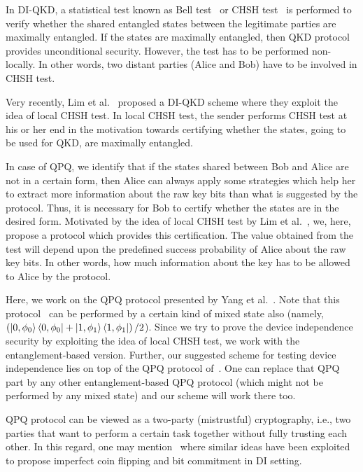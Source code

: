 \documentclass[twocolumn,pra,aps,amssymb]{revtex4}
\begin{document}
In DI-QKD, a statistical test known as Bell test~\cite{Bell} or CHSH test~\cite{CHSH} is performed to verify whether the shared entangled states between the legitimate parties are maximally entangled. If the states are maximally entangled, then QKD protocol provides unconditional security. However, the test has to be performed non-locally. In other words, two distant parties (Alice and Bob) have to be involved in CHSH test.

Very recently, Lim et al.~\cite{Lim} proposed a DI-QKD scheme where they exploit the idea of local CHSH test. In local CHSH test, the sender performs CHSH test at his or her end in the motivation towards certifying whether the states, going to be used for QKD, are maximally entangled. 

In case of QPQ, we identify that if the states shared between Bob and Alice are not in a certain form, then Alice can always apply some strategies which help her to extract more information about the raw key bits than what is suggested by the protocol. Thus, it is necessary for Bob to certify whether the states are in the desired form. Motivated by the idea of local CHSH test by Lim et al.~\cite{Lim}, we, here, propose a protocol which provides this certification. 
The value obtained from the test will depend upon the predefined success probability of Alice about the raw key bits. In other words, how much information about the key has to be allowed to Alice by the protocol.

Here, we work on the QPQ protocol presented by Yang et al.~\cite{Yang}.   
Note that this protocol~\cite{Yang} can be performed by a certain kind of mixed state also (namely, $\left(\left|0,\phi_0\right\rangle\left\langle0,\phi_0\right|+\left|1,\phi_1\right\rangle\left\langle1,\phi_1\right|\right)/2$). Since we try to prove the device independence security by exploiting the idea of local CHSH test, we work with the entanglement-based version. Further, our suggested scheme for testing device independence lies on top of the QPQ protocol of~\cite{Yang}. One can replace that QPQ part by any other entanglement-based QPQ protocol (which might not be performed by any mixed state) and our scheme will work there too.

QPQ protocol can be viewed as a two-party (mistrustful) cryptography, i.e., two parties that want to perform a certain task together without fully trusting
each other. In this regard, one may mention~\cite{Silman1,Silman2,Kaniewski1,Kaniewski2,Wehner} where similar ideas have been exploited to propose imperfect coin flipping and bit commitment in DI setting.
\end{document}
